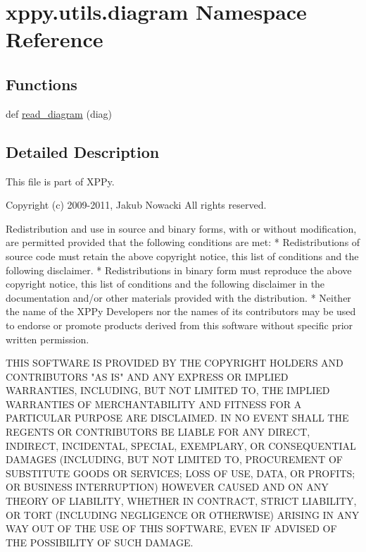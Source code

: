 \hypertarget{namespacexppy_1_1utils_1_1diagram}{}\section{xppy.\+utils.\+diagram Namespace Reference}
\label{namespacexppy_1_1utils_1_1diagram}
\subsection*{Functions}
\begin{DoxyCompactItemize}
\item 
def \mbox{\hyperlink{namespacexppy_1_1utils_1_1diagram_a0ce186ce6f21dbf7012b06027fba023b}{read\+\_\+diagram}} (diag)
\end{DoxyCompactItemize}


\subsection{Detailed Description}
\begin{DoxyVerb}This file is part of XPPy.

Copyright (c) 2009-2011, Jakub Nowacki
All rights reserved.

Redistribution and use in source and binary forms, with or without
modification, are permitted provided that the following conditions are met:
* Redistributions of source code must retain the above copyright
  notice, this list of conditions and the following disclaimer.
* Redistributions in binary form must reproduce the above copyright
  notice, this list of conditions and the following disclaimer in the
  documentation and/or other materials provided with the distribution.
* Neither the name of the XPPy Developers nor the
  names of its contributors may be used to endorse or promote products
  derived from this software without specific prior written permission.

THIS SOFTWARE IS PROVIDED BY THE COPYRIGHT HOLDERS AND CONTRIBUTORS "AS IS" AND
ANY EXPRESS OR IMPLIED WARRANTIES, INCLUDING, BUT NOT LIMITED TO, THE IMPLIED
WARRANTIES OF MERCHANTABILITY AND FITNESS FOR A PARTICULAR PURPOSE ARE
DISCLAIMED. IN NO EVENT SHALL THE REGENTS OR CONTRIBUTORS BE LIABLE FOR ANY
DIRECT, INDIRECT, INCIDENTAL, SPECIAL, EXEMPLARY, OR CONSEQUENTIAL DAMAGES
(INCLUDING, BUT NOT LIMITED TO, PROCUREMENT OF SUBSTITUTE GOODS OR SERVICES;
LOSS OF USE, DATA, OR PROFITS; OR BUSINESS INTERRUPTION) HOWEVER CAUSED AND
ON ANY THEORY OF LIABILITY, WHETHER IN CONTRACT, STRICT LIABILITY, OR TORT
(INCLUDING NEGLIGENCE OR OTHERWISE) ARISING IN ANY WAY OUT OF THE USE OF THIS
SOFTWARE, EVEN IF ADVISED OF THE POSSIBILITY OF SUCH DAMAGE.
\end{DoxyVerb}
 

